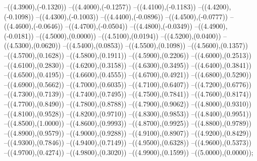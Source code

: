 {	--({\sx*(4.3900)},{\sy*(-0.1320)})
	--({\sx*(4.4000)},{\sy*(-0.1257)})
	--({\sx*(4.4100)},{\sy*(-0.1183)})
	--({\sx*(4.4200)},{\sy*(-0.1098)})
	--({\sx*(4.4300)},{\sy*(-0.1003)})
	--({\sx*(4.4400)},{\sy*(-0.0896)})
	--({\sx*(4.4500)},{\sy*(-0.0777)})
	--({\sx*(4.4600)},{\sy*(-0.0646)})
	--({\sx*(4.4700)},{\sy*(-0.0504)})
	--({\sx*(4.4800)},{\sy*(-0.0349)})
	--({\sx*(4.4900)},{\sy*(-0.0181)})
	--({\sx*(4.5000)},{\sy*(0.0000)})
	--({\sx*(4.5100)},{\sy*(0.0194)})
	--({\sx*(4.5200)},{\sy*(0.0400)})
	--({\sx*(4.5300)},{\sy*(0.0620)})
	--({\sx*(4.5400)},{\sy*(0.0853)})
	--({\sx*(4.5500)},{\sy*(0.1098)})
	--({\sx*(4.5600)},{\sy*(0.1357)})
	--({\sx*(4.5700)},{\sy*(0.1628)})
	--({\sx*(4.5800)},{\sy*(0.1911)})
	--({\sx*(4.5900)},{\sy*(0.2206)})
	--({\sx*(4.6000)},{\sy*(0.2513)})
	--({\sx*(4.6100)},{\sy*(0.2830)})
	--({\sx*(4.6200)},{\sy*(0.3158)})
	--({\sx*(4.6300)},{\sy*(0.3495)})
	--({\sx*(4.6400)},{\sy*(0.3841)})
	--({\sx*(4.6500)},{\sy*(0.4195)})
	--({\sx*(4.6600)},{\sy*(0.4555)})
	--({\sx*(4.6700)},{\sy*(0.4921)})
	--({\sx*(4.6800)},{\sy*(0.5290)})
	--({\sx*(4.6900)},{\sy*(0.5662)})
	--({\sx*(4.7000)},{\sy*(0.6035)})
	--({\sx*(4.7100)},{\sy*(0.6407)})
	--({\sx*(4.7200)},{\sy*(0.6776)})
	--({\sx*(4.7300)},{\sy*(0.7139)})
	--({\sx*(4.7400)},{\sy*(0.7495)})
	--({\sx*(4.7500)},{\sy*(0.7841)})
	--({\sx*(4.7600)},{\sy*(0.8174)})
	--({\sx*(4.7700)},{\sy*(0.8490)})
	--({\sx*(4.7800)},{\sy*(0.8788)})
	--({\sx*(4.7900)},{\sy*(0.9062)})
	--({\sx*(4.8000)},{\sy*(0.9310)})
	--({\sx*(4.8100)},{\sy*(0.9528)})
	--({\sx*(4.8200)},{\sy*(0.9710)})
	--({\sx*(4.8300)},{\sy*(0.9853)})
	--({\sx*(4.8400)},{\sy*(0.9951)})
	--({\sx*(4.8500)},{\sy*(1.0000)})
	--({\sx*(4.8600)},{\sy*(0.9993)})
	--({\sx*(4.8700)},{\sy*(0.9925)})
	--({\sx*(4.8800)},{\sy*(0.9789)})
	--({\sx*(4.8900)},{\sy*(0.9579)})
	--({\sx*(4.9000)},{\sy*(0.9288)})
	--({\sx*(4.9100)},{\sy*(0.8907)})
	--({\sx*(4.9200)},{\sy*(0.8429)})
	--({\sx*(4.9300)},{\sy*(0.7846)})
	--({\sx*(4.9400)},{\sy*(0.7149)})
	--({\sx*(4.9500)},{\sy*(0.6328)})
	--({\sx*(4.9600)},{\sy*(0.5373)})
	--({\sx*(4.9700)},{\sy*(0.4274)})
	--({\sx*(4.9800)},{\sy*(0.3020)})
	--({\sx*(4.9900)},{\sy*(0.1599)})
	--({\sx*(5.0000)},{\sy*(0.0000)});
}
